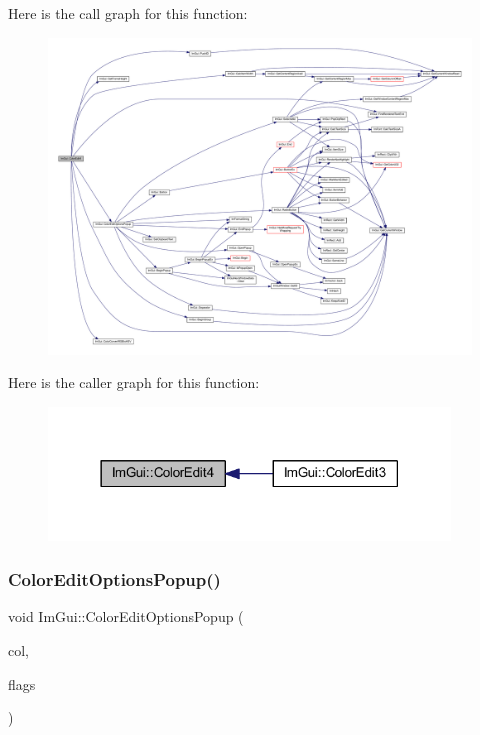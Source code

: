 Here is the call graph for this function\+:
\nopagebreak
\begin{figure}[H]
\begin{center}
\leavevmode
\includegraphics[width=350pt]{namespace_im_gui_ac3f45e2aa0b1d591cc8a2cdf8b566a45_cgraph}
\end{center}
\end{figure}
Here is the caller graph for this function\+:
\nopagebreak
\begin{figure}[H]
\begin{center}
\leavevmode
\includegraphics[width=302pt]{namespace_im_gui_ac3f45e2aa0b1d591cc8a2cdf8b566a45_icgraph}
\end{center}
\end{figure}
\mbox{\label{namespace_im_gui_a6bfb117816d669f8704e5d0c0c0795fe}} 
\subsubsection{\texorpdfstring{Color\+Edit\+Options\+Popup()}{ColorEditOptionsPopup()}}
{\footnotesize\ttfamily void Im\+Gui\+::\+Color\+Edit\+Options\+Popup (\begin{DoxyParamCaption}\item[{const float $\ast$}]{col,  }\item[{\mbox{\hyperlink{imgui_8h_a6b2d5e95adc38f22c021252189f669c6}{Im\+Gui\+Color\+Edit\+Flags}}}]{flags }\end{DoxyParamCaption})}

